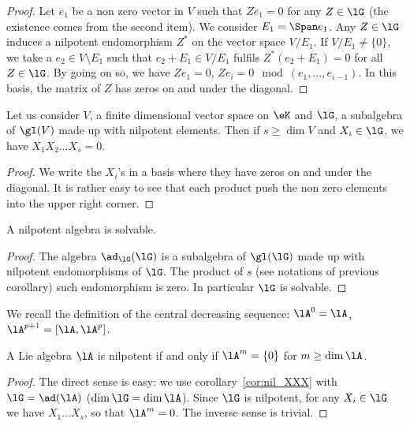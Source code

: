 \begin{proof}
 Let $e_1$ be a non zero vector in $V$ such that $Ze_1=0$ for any $Z\in\lG$ (the existence comes from the second item). We consider $E_1=\Span e_1$. Any $Z\in\lG$ induces a nilpotent endomorphism $Z^*$ on the vector space $V/E_1$. If $V/E_1\neq\{0\}$, we take a $e_2\in V\setminus E_1$ such that $e_2+E_1\in V/E_1$ fulfils $Z^*(e_2+E_1)=0$ for all $Z\in\lG$. By going on so, we have $Ze_1=0$, $Ze_i=0\mod(e_1,\ldots,e_{i-1})$. In this basis, the matrix of $Z$ has zeros on and under the diagonal.
\end{proof}

\begin{corollary}
Let us consider $V$, a finite dimensional vector space on $\eK$ and $\lG$, a subalgebra of $\gl(V)$ made up with nilpotent elements. Then if $s\geq\dim V$ and $X_i\in\lG$, we have $X_1X_2\ldots X_s=0$.
\label{cor:nil_XXX}
\end{corollary}

\begin{proof}
We write the $X_i$'s in a basis where they have zeros on and under the diagonal. It is rather easy to see that each product push the non zero elements into the upper right corner.
\end{proof}

\begin{corollary}
A nilpotent algebra is solvable.
\end{corollary}

\begin{proof}
The algebra $\ad_{\lG}(\lG)$ is a subalgebra of $\gl(\lG)$ made up with nilpotent endomorphisms of $\lG$. The product of $s$ (see notations of previous corollary) such endomorphism is zero. In particular $\lG$ is solvable.
\end{proof}

We recall the definition of the central decreasing sequence: $\lA^0=\lA$, $\lA^{p+1}=[\lA,\lA^p]$.

\begin{corollary}
A Lie algebra $\lA$ is nilpotent if and only if $\lA^m=\{0\}$ for $m\geq\dim\lA$.
\label{cor:nil_Gn}
\end{corollary}

\begin{proof}
The direct sense is easy: we use corollary~\ref{cor:nil_XXX} with $\lG=\ad(\lA)$ ($\dim\lG=\dim\lA$). Since $\lG$ is nilpotent, for any $X_i\in\lG$ we have $X_1\ldots X_s$, so that $\lA^m=0$. The inverse sense is trivial.

\end{proof}

